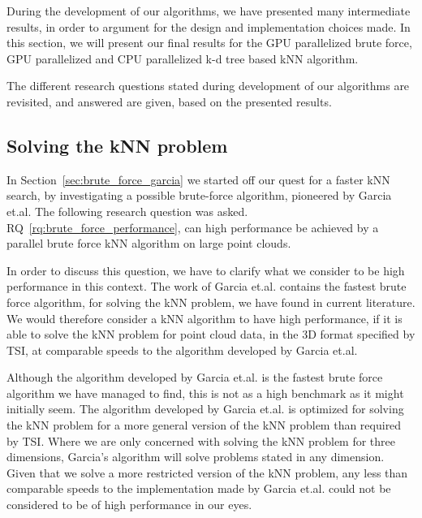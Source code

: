 During the development of our algorithms, we have presented many intermediate results, in order to argument for the design and implementation choices made. In this section, we will present our final results for the GPU parallelized brute force, GPU parallelized and CPU parallelized k-d tree based kNN algorithm.

The different research questions stated during development of our algorithms are revisited, and answered are given, based on the presented results. 

\subsection{Solving the kNN problem} %
\label{sub:solving_the_knn_problem}

In Section~\ref{sec:brute_force_garcia} we started off our quest for a faster kNN search, by investigating a possible brute-force algorithm, pioneered by Garcia et.al. The following research question was asked. RQ~\ref{rq:brute_force_performance}, can high performance be achieved by a parallel brute force kNN algorithm on large point clouds.

In order to discuss this question, we have to clarify what we consider to be high performance in this context. The work of Garcia et.al. contains the fastest brute force algorithm, for solving the kNN problem, we have found in current literature. We would therefore consider a kNN algorithm to have high performance, if it is able to solve the kNN problem for point cloud data, in the 3D format specified by TSI, at comparable speeds to the algorithm developed by Garcia et.al. 

Although the algorithm developed by Garcia et.al. is the fastest brute force algorithm we have managed to find, this is not as a high benchmark as it might initially seem. The algorithm developed by Garcia et.al. is optimized for solving the kNN problem for a more general version of the kNN problem than required by TSI. Where we are only concerned with solving the kNN problem for three dimensions, Garcia's algorithm will solve problems stated in any dimension. Given that we solve a more restricted version of the kNN problem, any less than comparable speeds to the implementation made by Garcia et.al. could not be considered to be of high performance in our eyes.

